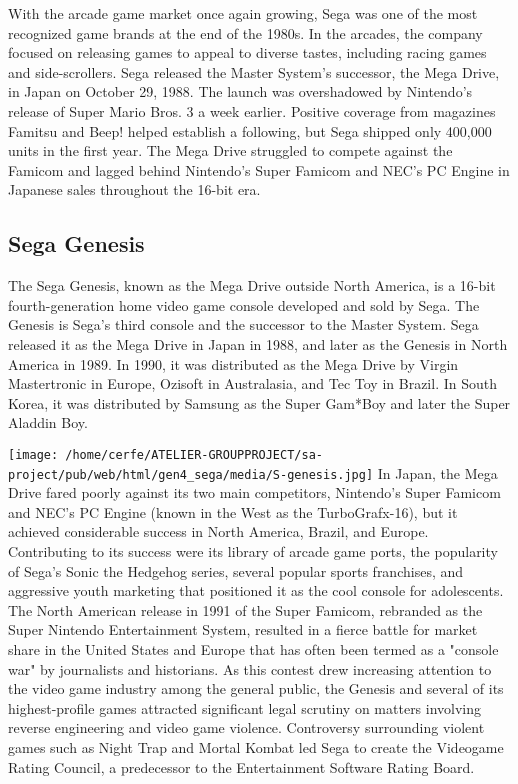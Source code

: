 \documentclass[a4paper,10pt]{book}
\begin{document}
            With the arcade game market once again growing, Sega was one of the most recognized game brands at the end of the 1980s. 
            In the arcades, the company focused on releasing games to appeal to diverse tastes, including racing games and side-scrollers. 
            Sega released the Master System's successor, the Mega Drive, in Japan on October 29, 1988. 
            The launch was overshadowed by Nintendo's release of Super Mario Bros. 3 a week earlier. 
            Positive coverage from magazines Famitsu and Beep! helped establish a following, but Sega shipped only 400,000 units in the first year. 
            The Mega Drive struggled to compete against the Famicom and lagged behind Nintendo's Super Famicom and NEC's PC Engine in Japanese sales throughout the 16-bit era.
         
 \subsection{Sega Genesis  }
 
            The Sega Genesis, known as the Mega Drive outside North America, is a 16-bit fourth-generation home video game console developed and sold by Sega. 
            The Genesis is Sega's third console and the successor to the Master System. 
            Sega released it as the Mega Drive in Japan in 1988, and later as the Genesis in North America in 1989. 
            In 1990, it was distributed as the Mega Drive by Virgin Mastertronic in Europe, Ozisoft in Australasia, and Tec Toy in Brazil. 
            In South Korea, it was distributed by Samsung as the Super Gam*Boy and later the Super Aladdin Boy.
         
 \texttt{[image: /home/cerfe/ATELIER-GROUPPROJECT/sa-project/pub/web/html/gen4\_sega/media/S-genesis.jpg]}
 In Japan, the Mega Drive fared poorly against its two main competitors, Nintendo's Super Famicom and NEC's PC Engine (known in the West as the TurboGrafx-16), but it achieved considerable success in North America, Brazil, and Europe. 
            Contributing to its success were its library of arcade game ports, the popularity of Sega's Sonic the Hedgehog series, several popular sports franchises, and aggressive youth marketing that positioned it as the cool console for adolescents. 
            The North American release in 1991 of the Super Famicom, rebranded as the Super Nintendo Entertainment System, resulted in a fierce battle for market share in the United States and Europe that has often been termed as a "console war" by journalists and historians. 
            As this contest drew increasing attention to the video game industry among the general public, the Genesis and several of its highest-profile games attracted significant legal scrutiny on matters involving reverse engineering and video game violence. 
            Controversy surrounding violent games such as Night Trap and Mortal Kombat led Sega to create the Videogame Rating Council, a predecessor to the Entertainment Software Rating Board.
         
\end{document}

